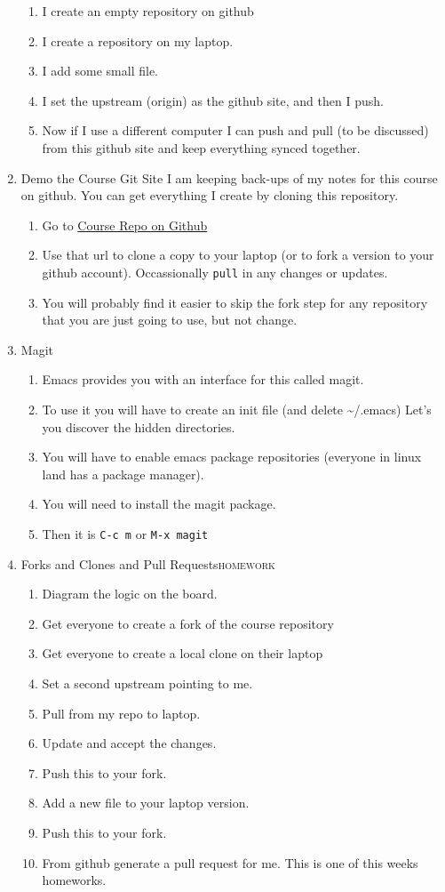 \documentclass{article}
\begin{document}
\begin{enumerate}
\begin{enumerate}
\item I create an empty repository on github
\item I create a repository on my laptop.
\item I add some small file.
\item I set the upstream (origin) as the github site, and then I push.
\item Now if I use a different computer I can push and pull (to be discussed) from this github site and keep everything synced together.
\end{enumerate}
\item Demo the Course Git Site
\label{sec:org69b3c30}
I am keeping back-ups of my notes for this course on github. You can get everything I create by cloning this repository.
\begin{enumerate}
\item Go to \href{https://github.com/brittAnderson/psych363}{Course Repo on Github}
\item Use that url to clone a copy to your laptop (or to fork a version to your github account). Occassionally \texttt{pull} in any changes or updates.
\item You will probably find it easier to skip the fork step for any repository that you are just going to use, but not change.
\end{enumerate}
\item Magit
\label{sec:org996a3d8}
\begin{enumerate}
\item Emacs provides you with an interface for this called magit.
\item To use it you will have to create an init file (and delete \textasciitilde{}/.emacs)
Let's you discover the hidden directories.
\item You will have to enable emacs package repositories (everyone in linux land has a package manager).
\item You will need to install the magit package.
\item Then it is \texttt{C-c m} or \texttt{M-x magit}
\end{enumerate}
\item Forks and Clones and Pull Requests\hfill{}\textsc{homework}
\label{sec:org399a0d6}
\begin{enumerate}
\item Diagram the logic on the board.
\item Get everyone to create a fork of the course repository
\item Get everyone to create a local clone on their laptop
\item Set a second upstream pointing to me.
\item Pull from my repo to laptop.
\item Update and accept the changes.
\item Push this to your fork.
\item Add a new file to your laptop version.
\item Push this to your fork.
\item From github generate a pull request for me. This is one of this weeks homeworks.
\end{enumerate}
\end{enumerate}
\end{document}

